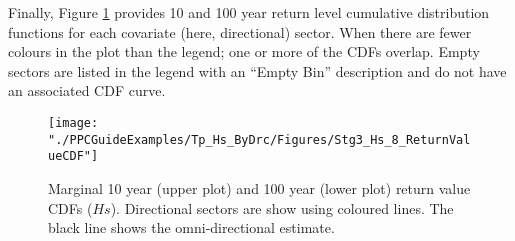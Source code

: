 Finally, Figure \ref{fig:Stg3_Hs_7_ReturnValueCDF} provides 10 and 100 year return level cumulative distribution functions for each covariate (here, directional) sector. When there are fewer colours in the plot than the legend; one or more of the CDFs overlap. Empty sectors are listed in the legend with an ``Empty Bin'' description and do not have an associated CDF curve. 

\begin{figure}
	\centering
	\texttt{[image: "./PPCGuideExamples/Tp\_Hs\_ByDrc/Figures/Stg3\_Hs\_8\_ReturnValueCDF"]}
	\caption{Marginal 10 year (upper plot) and 100 year (lower plot) return value CDFs ($Hs$). Directional sectors are show using coloured lines. The black line shows the omni-directional estimate.}
	\label{fig:Stg3_Hs_7_ReturnValueCDF}
\end{figure}
\newpage
